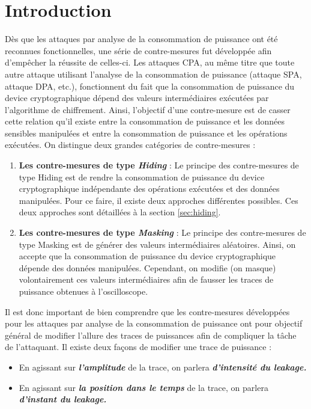 \documentclass[oneside]{book}
\begin{document}
\section{Introduction}
\label{sec:intro_contremesure}

Dès que les attaques par analyse de la consommation de puissance ont été reconnues fonctionnelles, une série de contre-mesures \cite{mangard_power_2007} fut développée afin d'empêcher la réussite de celles-ci. Les attaques CPA, au même titre que toute autre attaque utilisant l'analyse de la consommation de puissance (attaque SPA, attaque DPA, etc.), fonctionnent du fait que la consommation de puissance du device cryptographique dépend des valeurs intermédiaires exécutées par l'algorithme de chiffrement. Ainsi, l'objectif d'une contre-mesure est de casser cette relation qu'il existe entre la consommation de puissance et les données sensibles manipulées et entre la consommation de puissance et les opérations exécutées. On distingue deux grandes catégories de contre-mesures : 
\begin{enumerate}
\item \textbf{Les contre-mesures de type \textit{Hiding}} \cite{fernando} : Le principe des contre-mesures de type Hiding est de rendre la consommation de puissance du device cryptographique indépendante des opérations exécutées et des données manipulées. Pour ce faire, il existe deux approches différentes possibles. Ces deux approches sont détaillées à la section \ref{sec:hiding}.
\item \textbf{Les contre-mesures de type \textit{Masking}} \cite{mangard_power_2007} : Le principe des contre-mesures de type Masking est de générer des valeurs intermédiaires aléatoires. Ainsi, on accepte que la consommation de puissance du device cryptographique dépende des données manipulées. Cependant, on modifie (on masque) volontairement ces valeurs intermédiaires afin de fausser les traces de puissance obtenues à l'oscilloscope. \\
\end{enumerate}

\hspace{-0.5cm}Il est donc important de bien comprendre que les contre-mesures développées pour les attaques par analyse de la consommation de puissance ont pour objectif général de modifier l'allure des traces de puissances afin de compliquer la tâche de l'attaquant. Il existe deux façons de modifier une trace de puissance : 
\begin{itemize}
\item En agissant sur \textbf{\textit{l'amplitude}} de la trace, on parlera \textbf{\textit{d'intensité du leakage.}}
\item En agissant sur \textbf{\textit{la position dans le temps}} de la trace, on parlera \textbf{\textit{d'instant du leakage.}} \\
\end{itemize}
\end{document}
